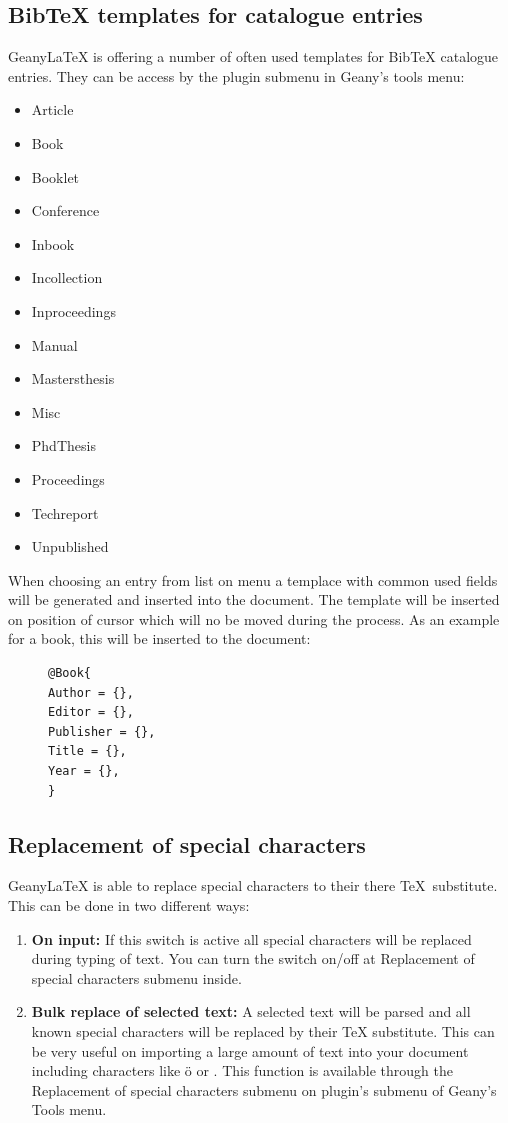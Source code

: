 \documentclass[%
paper=a4,%
fontsize=11pt,%
twoside=false,%
DIV18,
headsepline,
plainheadsepline,
footsepline,
plainfootsepline,
bibliography=totoc,%
listof=totoc,%
BCOR10mm,%
parskip=half,%
openany,%
]{scrartcl}
\begin{document}
\subsection{BibTeX templates for catalogue entries}
Geany\LaTeX{} is offering a number of often used templates for BibTeX
catalogue entries. They can be access by the plugin submenu in Geany's
tools menu:
\begin{itemize}
	\item Article
	\item Book
	\item Booklet
	\item Conference
	\item Inbook
	\item Incollection
	\item Inproceedings
	\item Manual
	\item Mastersthesis
	\item Misc
	\item PhdThesis
	\item Proceedings
	\item Techreport
	\item Unpublished
\end{itemize}
When choosing an entry from list on menu a templace with common used
fields will be generated and inserted into the document.
The template will be inserted on position of cursor which will
no be moved during the process. As an example for a book, this will be
inserted to the document:

\begin{figure}[h!]
\begin{lstlisting}
@Book{
Author = {},
Editor = {},
Publisher = {},
Title = {},
Year = {},
}
\end{lstlisting}
\end{figure}

\subsection{Replacement of special characters}
Geany\LaTeX{} is able to replace special characters to their there \TeX\
substitute. This can be done in two different ways:

\begin{enumerate}
	\item \textbf{On input:} If this switch is active all special
		  characters will be replaced during typing of text. You can
		  turn the switch on/off at Replacement of special characters
		  submenu inside.
	\item \textbf{Bulk replace of selected text:}
		  A selected text will be parsed and all known special characters
		  will be replaced by their \TeX{} substitute. This can be very useful
		  on importing a large amount of text into your document
		  including characters like ö or \frqq. This function is
		  available through the Replacement of special characters
		  submenu on plugin's submenu of Geany's Tools menu.
\end{enumerate}
\end{document}
